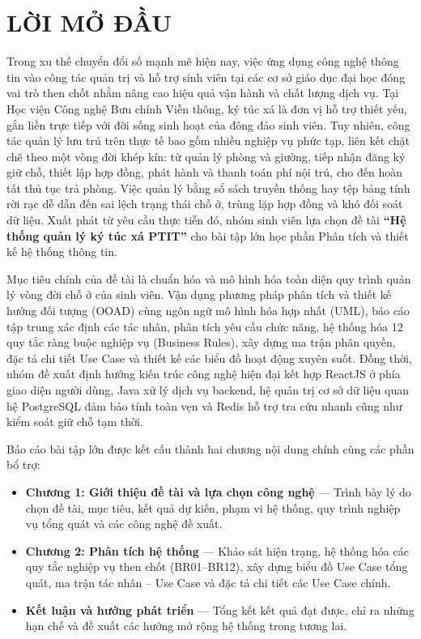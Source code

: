 \clearpage
\chapter*{LỜI MỞ ĐẦU}
{}

Trong xu thế chuyển đổi số mạnh mẽ hiện nay, việc ứng dụng công nghệ thông tin vào công tác quản trị và hỗ trợ sinh viên tại các cơ sở giáo dục đại học đóng vai trò then chốt nhằm nâng cao hiệu quả vận hành và chất lượng dịch vụ. Tại Học viện Công nghệ Bưu chính Viễn thông, ký túc xá là đơn vị hỗ trợ thiết yếu, gắn liền trực tiếp với đời sống sinh hoạt của đông đảo sinh viên. Tuy nhiên, công tác quản lý lưu trú trên thực tế bao gồm nhiều nghiệp vụ phức tạp, liên kết chặt chẽ theo một vòng đời khép kín: từ quản lý phòng và giường, tiếp nhận đăng ký giữ chỗ, thiết lập hợp đồng, phát hành và thanh toán phí nội trú, cho đến hoàn tất thủ tục trả phòng. Việc quản lý bằng sổ sách truyền thống hay tệp bảng tính rời rạc dễ dẫn đến sai lệch trạng thái chỗ ở, trùng lặp hợp đồng và khó đối soát dữ liệu. Xuất phát từ yêu cầu thực tiễn đó, nhóm sinh viên lựa chọn đề tài \textbf{“Hệ thống quản lý ký túc xá PTIT”} cho bài tập lớn học phần Phân tích và thiết kế hệ thống thông tin.

Mục tiêu chính của đề tài là chuẩn hóa và mô hình hóa toàn diện quy trình quản lý vòng đời chỗ ở của sinh viên. Vận dụng phương pháp phân tích và thiết kế hướng đối tượng (OOAD) cùng ngôn ngữ mô hình hóa hợp nhất (UML), báo cáo tập trung xác định các tác nhân, phân tích yêu cầu chức năng, hệ thống hóa 12 quy tắc ràng buộc nghiệp vụ (Business Rules), xây dựng ma trận phân quyền, đặc tả chi tiết Use Case và thiết kế các biểu đồ hoạt động xuyên suốt. Đồng thời, nhóm đề xuất định hướng kiến trúc công nghệ hiện đại kết hợp ReactJS ở phía giao diện người dùng, Java xử lý dịch vụ backend, hệ quản trị cơ sở dữ liệu quan hệ PostgreSQL đảm bảo tính toàn vẹn và Redis hỗ trợ tra cứu nhanh cũng như kiểm soát giữ chỗ tạm thời.

Báo cáo bài tập lớn được kết cấu thành hai chương nội dung chính cùng các phần bổ trợ:
\begin{itemize}[nosep,leftmargin=1.5em]
\item \textbf{Chương 1: Giới thiệu đề tài và lựa chọn công nghệ} --- Trình bày lý do chọn đề tài, mục tiêu, kết quả dự kiến, phạm vi hệ thống, quy trình nghiệp vụ tổng quát và các công nghệ đề xuất.
\item \textbf{Chương 2: Phân tích hệ thống} --- Khảo sát hiện trạng, hệ thống hóa các quy tắc nghiệp vụ then chốt (BR01--BR12), xây dựng biểu đồ Use Case tổng quát, ma trận tác nhân -- Use Case và đặc tả chi tiết các Use Case chính.
\item \textbf{Kết luận và hướng phát triển} --- Tổng kết kết quả đạt được, chỉ ra những hạn chế và đề xuất các hướng mở rộng hệ thống trong tương lai.
\end{itemize}

